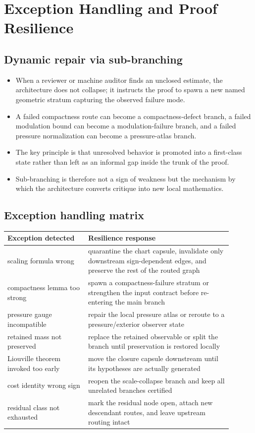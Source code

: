 \documentclass[11pt]{article}
\theoremstyle{plain}
\theoremstyle{definition}
\theoremstyle{remark}
\begin{document}
\section{Exception Handling and Proof Resilience}
\label{sec:resilience}

\subsection{Dynamic repair via sub-branching}
\begin{itemize}
  \item When a reviewer or machine auditor finds an unclosed estimate, the architecture does not collapse; it instructs the proof to spawn a new named geometric stratum capturing the observed failure mode.
  \item A failed compactness route can become a compactness-defect branch, a failed modulation bound can become a modulation-failure branch, and a failed pressure normalization can become a pressure-atlas branch.
  \item The key principle is that unresolved behavior is promoted into a first-class state rather than left as an informal gap inside the trunk of the proof.
  \item Sub-branching is therefore not a sign of weakness but the mechanism by which the architecture converts critique into new local mathematics.
\end{itemize}

\subsection{Exception handling matrix}
\begin{center}
\begin{longtable}{p{0.32\linewidth}p{0.58\linewidth}}
\toprule
Exception detected & Resilience response \\
\midrule
scaling formula wrong & quarantine the chart capsule, invalidate only downstream sign-dependent edges, and preserve the rest of the routed graph \\
compactness lemma too strong & spawn a compactness-failure stratum or strengthen the input contract before re-entering the main branch \\
pressure gauge incompatible & repair the local pressure atlas or reroute to a pressure/exterior observer state \\
retained mass not preserved & replace the retained observable or split the branch until preservation is restored locally \\
Liouville theorem invoked too early & move the closure capsule downstream until its hypotheses are actually generated \\
cost identity wrong sign & reopen the scale-collapse branch and keep all unrelated branches certified \\
residual class not exhausted & mark the residual node open, attach new descendant routes, and leave upstream routing intact \\
\bottomrule
\end{longtable}
\end{center}
\end{document}
